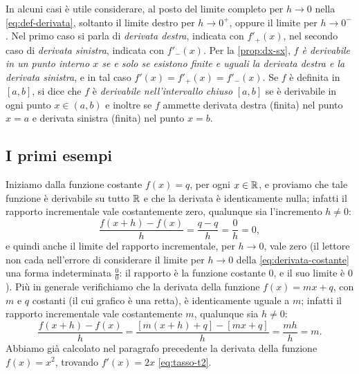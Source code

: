 In alcuni casi è utile considerare, al posto del limite completo per $h\to0$ nella
\eqref{eq:def-derivata}, soltanto il limite destro per $h\to0^{+}$, oppure il limite per
$h\to0^{-}$. Nel primo caso si parla di \emph{derivata destra}, indicata con
$f'_{+}(x)$, nel secondo caso di \emph{derivata sinistra}, indicata con $f'_{-}(x)$. Per
la \cref{prop:dx-sx}, \emph{$f$ è derivabile in un punto interno $x$ se e solo se
esistono finite e uguali la derivata destra e la derivata sinistra}, e in tal caso
$f'(x)=f'_{+}(x)=f'_{-}(x)$. Se $f$ è definita in $[a,b]$, si dice che $f$ è
\emph{derivabile nell'intervallo chiuso} $[a,b]$ se è derivabile in ogni punto $x\in(a,b)$
e inoltre se $f$ ammette derivata destra (finita) nel punto $x=a$ e derivata sinistra (finita) nel punto
$x=b$.

\subsection{I primi esempi}

\begin{esempio}\label{es:derivata-lineare}
Iniziamo dalla funzione costante $f(x)=q$, per ogni $x\in\mathbb{R}$, e proviamo che tale
funzione è derivabile su tutto $\mathbb{R}$ e che la derivata è identicamente nulla; infatti il
rapporto incrementale vale costantemente zero, qualunque sia l'incremento $h\neq0$:
\begin{equation}\label{eq:derivata-costante}
  \frac{f(x+h)-f(x)}{h}=\frac{q-q}{h}=\frac0h=0,
\end{equation}
e quindi anche il limite del rapporto incrementale, per $h\to0$, vale zero (il lettore non
cada nell'errore di considerare il limite per $h\to0$ della \eqref{eq:derivata-costante}
una forma indeterminata $\frac00$: il rapporto è la funzione costante $0$, e il suo limite
è $0$). Più in generale verifichiamo che la derivata della funzione $f(x)=mx+q$, con $m$
e $q$ costanti (il cui grafico è una retta), è identicamente uguale a $m$; infatti il
rapporto incrementale vale costantemente $m$, qualunque sia $h\neq0$:
\begin{equation}\label{eq:derivata-retta}
  \frac{f(x+h)-f(x)}{h}=\frac{[m(x+h)+q]-[mx+q]}{h}=\frac{mh}{h}=m .
\end{equation}
Abbiamo già calcolato nel paragrafo precedente la derivata della funzione $f(x)=x^{2}$,
trovando $f'(x)=2x$ \eqref{eq:tasso-t2}.
\end{esempio}

